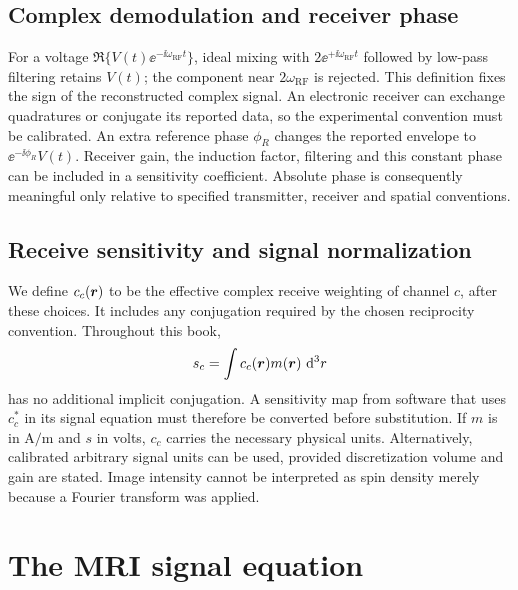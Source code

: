 \subsection{Complex demodulation and receiver phase}
For a voltage \(\Re\{V(t)\ee^{-\ii\omega_{\mathrm{RF}}t}\}\), ideal mixing with \(2\ee^{+\ii\omega_{\mathrm{RF}}t}\) followed by low-pass filtering retains \(V(t)\); the component near \(2\omega_{\mathrm{RF}}\) is rejected. This definition fixes the sign of the reconstructed complex signal. An electronic receiver can exchange quadratures or conjugate its reported data, so the experimental convention must be calibrated.
An extra reference phase \(\phi_R\) changes the reported envelope to
\(\ee^{-\ii\phi_R}V(t)\). Receiver gain, the induction factor, filtering and this constant phase can be included in a sensitivity coefficient. Absolute phase is consequently meaningful only relative to specified transmitter, receiver and spatial conventions.

\subsection{Receive sensitivity and signal normalization}
We define \(c_c(\bm{r})\) to be the effective complex receive weighting of channel \(c\), after these choices. It includes any conjugation required by the chosen reciprocity convention. Throughout this book,
\begin{equation}
 s_c=\int c_c(\bm{r})m(\bm{r})\,\mathop{}\!\mathrm{d}^3r
 \label{eq:06:receive}
\end{equation}
has no additional implicit conjugation. A sensitivity map from software that uses \(c_c^*\) in its signal equation must therefore be converted before substitution. If \(m\) is in \(\si{\ampere\per\metre}\) and \(s\) in volts, \(c_c\) carries the necessary physical units. Alternatively, calibrated arbitrary signal units can be used, provided discretization volume and gain are stated. Image intensity cannot be interpreted as spin density merely because a Fourier transform was applied.

\section{The MRI signal equation}
\label{sec:06:the-mri-signal-equation}
